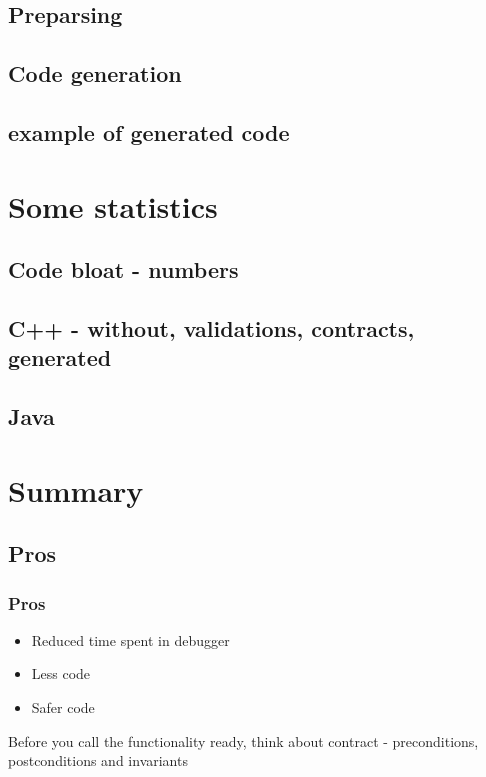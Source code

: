 \documentclass{beamer}
\begin{document}
\subsection{Preparsing}
\subsection{Code generation}
\subsection{example of generated code}


\section{Some statistics} %
\subsection{Code bloat - numbers}
\subsection{C++ - without, validations, contracts, generated}
\subsection{Java}

\section{Summary}
\subsection{Pros}
\begin{frame}
\frametitle{Pros}
\begin{itemize}
  \item Reduced time spent in debugger
  \item Less code
  \item Safer code
\end{itemize}
Before you call the functionality ready, think about contract - preconditions, postconditions and invariants
\end{frame}
\end{document}
